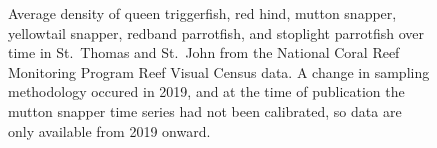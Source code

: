 \documentclass[
  letterpaper,
  oneside,
  open=any]{scrbook}
\begin{document}
\begin{figure}


\caption{\label{fig-RVCSTSJ}Average density of queen triggerfish, red
hind, mutton snapper, yellowtail snapper, redband parrotfish, and
stoplight parrotfish over time in St.~Thomas and St.~John from the
National Coral Reef Monitoring Program Reef Visual Census data. A change
in sampling methodology occured in 2019, and at the time of publication
the mutton snapper time series had not been calibrated, so data are only
available from 2019 onward.}

\end{figure}%
\end{document}
